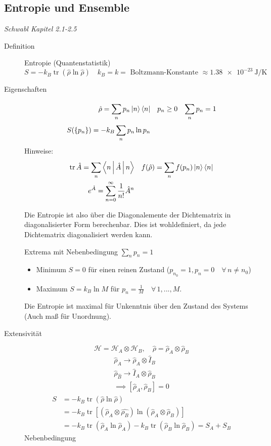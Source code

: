 \documentclass[11pt]{article}
\theoremstyle{plain}
\theoremstyle{mytheoremstyle}
\newcommand{\trace}{\operatorname{tr}}
\newcommand{\oo}{\infty}
\begin{document}
\subsection*{Entropie und Ensemble}
\emph{Schwabl Kapitel 2.1-2.5}\\
\begin{description}
  \item[Definition] Entropie (Quantenstatistik) \\
    \[ S =-k_B \trace(\hat{\rho} \ln{\hat{\rho}}) \quad k_B = k = 
      \text{ Boltzmann-Konstante }
    \approx \SI{1,38e-23}{\joule\per\kelvin} \] 
  \item[Eigenschaften] 
    \begin{align*}
      \hat{\rho} = \sum_{n}^{} p_n \Ket{n}\Bra{n} && p_n \ge 0 && \sum_{n}^{} p_n = 1 \\
      S(\left\{ p_n \right\}) = -k_B \sum_{n}^{} p_n \ln{p_n}
    \end{align*}
    Hinweise: \begin{align*}
      \trace \hat{A} = \sum_{n}^{} \Braket{n | \hat{A}|n} && f(\hat{\rho})= 
      \sum_{n}^{} f( p_n) \Ket{n}\Bra{n} \\
      e^{\hat{A}}= \sum_{n=0}^{ \oo } \frac{1}{n!}\hat{A}^n
    \end{align*}

    Die Entropie ist also \"uber die Diagonalemente der Dichtematrix in
    diagonalisierter Form berechenbar. Dies ist wohldefiniert, da jede
    Dichtematrix diagonalisiert werden kann.

    Extrema mit Nebenbedingung $\sum_{n}^{} p_n = 1$
    \begin{itemize}
      \item Minimum $S=0$ f\"ur einen reinen Zustand ($p_{n_0}=1, p_n =0
        \quad\forall\, n \neq n_0$)
      \item Maximum $S= k_B \ln{M}$ f\"ur $p_n = \frac{1}{M} \quad\forall\, 1,...,M$.
    \end{itemize}
    Die Entropie ist maximal f\"ur Unkenntnis \"uber den Zustand des Systems
    (Auch ma\ss{} f\"ur Unordnung).
  \item[Extensivit\"at] \[ \mathcal{H}= \mathcal{H}_A \otimes \mathcal{H}_B,
  \quad \hat{\rho} = \hat{\rho}_A \otimes  \hat{\rho}_B \] 
  \begin{align*}
    \hat{\rho}_A \to  \hat{\rho}_A \otimes  \hat{I}_B  \\
    \hat{\rho}_{\hat{B}} \to  \hat{I}_A \otimes  \hat{\rho}_B \\
    \implies \left[ \hat{\rho}_A, \hat{\rho}_B  \right]= 0
  \end{align*}
  \begin{align*}
    S & = -k_B \trace( \hat{\rho} \ln{\hat{\rho}})  \\
      & =  -k_B \trace \left[ (\hat{\rho}_A \otimes \hat{\rho_B}) 
  \ln{(\hat{\rho}_A \otimes \hat{\rho}_B)}  \right]  \\
  & = -k_B \trace (\hat{\rho}_A \ln{ \hat{\rho}_A}) - k_B \trace
    (\hat{\rho}_B \ln{ \hat{\rho}_B}) = S_A + S_B
  \end{align*}
  Nebenbedingung


\end{description}
\end{document}
